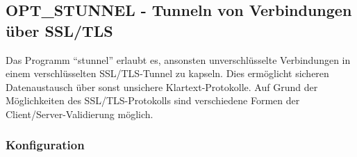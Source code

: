 \subsection{OPT\_STUNNEL - Tunneln von Verbindungen über SSL/TLS}

Das Programm ``stunnel'' erlaubt es, ansonsten unverschlüsselte Verbindungen
in einem verschlüsselten SSL/TLS-Tunnel zu kapseln. Dies ermöglicht sicheren
Datenaustausch über sonst unsichere Klartext-Protokolle. Auf Grund der
Möglichkeiten des SSL/TLS-Protokolls sind verschiedene Formen der
Client/Server-Validierung möglich.

\subsubsection{Konfiguration}
